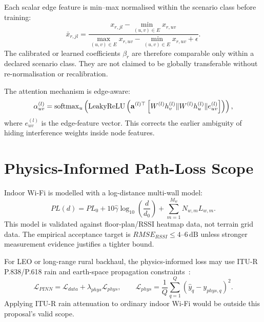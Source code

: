 Each scalar edge feature is min--max normalised within the scenario class before
training:
\begin{equation}
  \bar{x}_{r,jl}
  =
  \frac{x_{r,jl}-\min_{(u,v)\in E}x_{r,uv}}
  {\max_{(u,v)\in E}x_{r,uv}-\min_{(u,v)\in E}x_{r,uv}+\epsilon}.
  \label{eq:edge-feature-normalisation}
\end{equation}
The calibrated or learned coefficients $\beta_r$ are therefore comparable only within
a declared scenario class. They are not claimed to be globally transferable without
re-normalisation or recalibration.

The attention mechanism is edge-aware:
\begin{equation}
  \alpha_{uv}^{(l)}
  =
  \operatorname{softmax}_{u}
  \left(
  \operatorname{LeakyReLU}
  \left(
  \mathbf{a}^{(l)\top}
  \left[
  W^{(l)}h_v^{(l)}
  \Vert
  W^{(l)}h_u^{(l)}
  \Vert
  e_{uv}^{(l)}
  \right]
  \right)
  \right),
  \label{eq:edge-aware-attention}
\end{equation}
where $e_{uv}^{(l)}$ is the edge-feature vector. This corrects the earlier ambiguity
of hiding interference weights inside node features.

\section{Physics-Informed Path-Loss Scope}
\label{sec:pinn}

Indoor Wi-Fi is modelled with a log-distance multi-wall model:
\begin{equation}
  PL(d)
  =
  PL_0
  +10\hat{\gamma}\log_{10}\left(\frac{d}{d_0}\right)
  +\sum_{m=1}^{M_w}N_{w,m}L_{w,m}.
  \label{eq:multiwall}
\end{equation}
This model is validated against floor-plan/RSSI heatmap data, not terrain grid data.
The empirical acceptance target is $RMSE_{RSSI}\leq4$--$6\,\mathrm{dB}$ unless
stronger measurement evidence justifies a tighter bound.

For LEO or long-range rural backhaul, the physics-informed loss may use ITU-R
P.838/P.618 rain and earth-space propagation constraints~\cite{itu-p838,itu-p618}:
\begin{equation}
  \mathcal{L}_{PINN}
  =
  \mathcal{L}_{data}
  +\lambda_{phys}\mathcal{L}_{phys},
  \qquad
  \mathcal{L}_{phys}
  =
  \frac{1}{Q}
  \sum_{q=1}^{Q}
  (\hat{y}_q-y_{phys,q})^2.
  \label{eq:pinn-loss}
\end{equation}
Applying ITU-R rain attenuation to ordinary indoor Wi-Fi would be outside this
proposal's valid scope.

